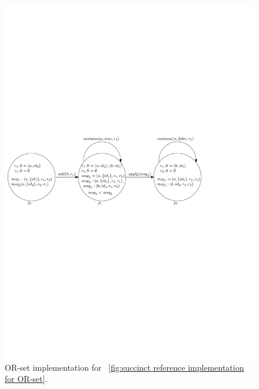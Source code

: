 \begin{figure}[t]
  \centering
  \includegraphics[width=0.8 \textwidth]{figures/PIC-OR-set-Implementation-Execution.pdf}
  \caption{OR-set implementation for \figurename~\ref{fig:succinct reference implementation for OR-set}.}
  \label{fig:or-set implemtation for succinct or-set specification}
\end{figure}


